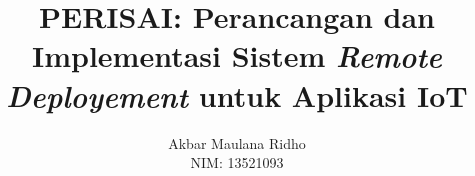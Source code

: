 \documentclass[bahasa, 12pt, a4paper, onecolumn, oneside, final]{report}
\begin{document}
\title{PERISAI: Perancangan dan Implementasi Sistem \textit{Remote Deployement} untuk Aplikasi IoT}
\date{}
\author{
  Akbar Maulana Ridho \\
  NIM: 13521093
}
\newcommand\tanggalpengesahan{7 Juli 2024}




% 

\pagestyle{plain}



% 







% 
% 
% 
% 
% 




% 
\end{document}
